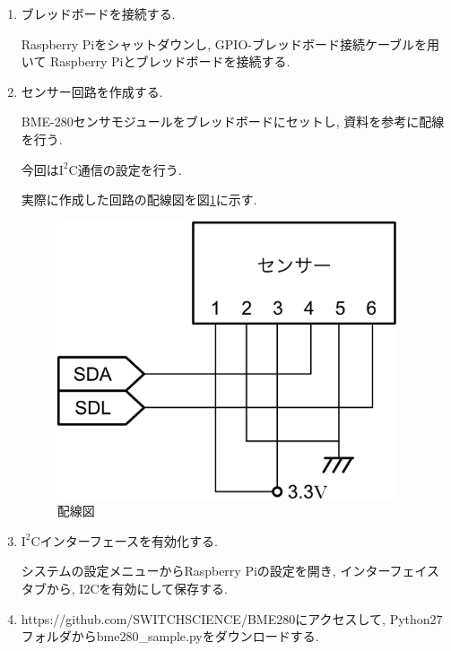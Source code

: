 \documentclass[titlepage]{jsarticle}
\begin{document}
            \begin{enumerate}
                \item ブレッドボードを接続する.

                    Raspberry Piをシャットダウンし, GPIO-ブレッドボード接続ケーブルを用いて
                    Raspberry Piとブレッドボードを接続する.

                \item センサー回路を作成する.

                    BME-280センサモジュールをブレッドボードにセットし, 
                    資料を参考に配線を行う.

                    今回は$\mathrm I^2 \mathrm C$通信の設定を行う.

                    実際に作成した回路の配線図を図\ref{fig: haisen}に示す.

                    \begin{figure}[ht]
                        \centering
                        \includegraphics[width=10cm]{images/haisen.pdf}
                        \caption{配線図}
                        \label{fig: haisen}
                    \end{figure}

                \item $\mathrm I^2 \mathrm C$インターフェースを有効化する.
                
                    システムの設定メニューからRaspberry Piの設定を開き,
                    インターフェイスタブから, I2Cを有効にして保存する.

                \item https://github.com/SWITCHSCIENCE/BME280にアクセスして,
                    Python27フォルダからbme280\_sample.pyをダウンロードする.


\end{enumerate}
\end{document}
